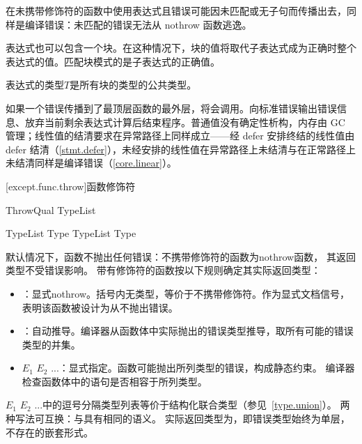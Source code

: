 \pnum
在未携带修饰符的函数中使用表达式且错误可能因未匹配或无子句而传播出去，同样是编译错误：未匹配的错误无法从 nothrow 函数逃逸。

\pnum
{}表达式也可以包含一个块。在这种情况下，块的值将取代子表达式成为正确时整个表达式的值。匹配块模式的是子表达式的正确值。

\pnum
{}表达式的类型$T$是所有块的类型的公共类型。

\pnum
如果一个错误传播到了最顶层函数的最外层，将会调用。向标准错误输出错误信息、放弃当前剩余表达式计算后结束程序。普通值没有确定性析构，内存由 GC 管理；线性值的结清要求在异常路径上同样成立——经 defer 安排终结的线性值由 defer 结清（\ref{stmt.defer}），未经安排的线性值在异常路径上未结清与在正常路径上未结清同样是编译错误（\ref{core.linear}）。

[except.func.throw]{函数修饰符}

\begin{bnf}{ThrowQual}
     \terminal{(} TypeList\bnfs \terminal{)} \br
\end{bnf}

\begin{bnf}{TypeList}
    Type \br
    TypeList \terminal{,} Type
\end{bnf}

\pnum
默认情况下，函数不抛出任何错误：不携带修饰符的函数为nothrow函数，
其返回类型不受错误影响。
带有修饰符的函数按以下规则确定其实际返回类型：

\begin{itemize}
\item
{}：显式nothrow。括号内无类型，等价于不携带修饰符。作为显式文档信号，表明该函数被设计为从不抛出错误。
\item
{}：自动推导。编译器从函数体中实际抛出的错误类型推导，取所有可能的错误类型的并集。
\item
{}$E_1$\tcode{,} $E_2$\tcode{,} ...\tcode{)}：显式指定。函数可能抛出所列类型的错误，构成静态约束。
编译器检查函数体中的语句是否相容于所列类型。
\end{itemize}

\pnum
{}$E_1$\tcode{,} $E_2$\tcode{,} ...\tcode{)}中的逗号分隔类型列表等价于结构化联合类型（参见~\ref{type.union}）。
两种写法可互换：与具有相同的语义。
实际返回类型为，即错误类型始终为单层\tcode{!!}，不存在的嵌套形式。

